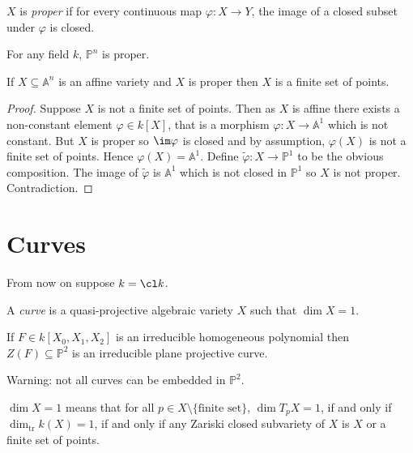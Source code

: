 \documentclass[a4paper]{article}
\renewcommand{\A}{\mathbb{A}}
\renewcommand*{\P}{\mathbb{P}}
\begin{document}
\begin{definition}[proper]
  \(X\) is \emph{proper} if for every continuous map \(\varphi: X \to Y\), the image of a closed subset under \(\varphi\) is closed.
\end{definition}

\begin{theorem}
  For any field \(k\), \(\P^n\) is proper.
\end{theorem}

\begin{corollary}
  If \(X \subseteq \A^n\) is an affine variety and \(X\) is proper then \(X\) is a finite set of points.
\end{corollary}

\begin{proof}
  Suppose \(X\) is not a finite set of points. Then as \(X\) is affine there exists a non-constant element \(\varphi \in k[X]\), that is a morphism \(\varphi: X \to \A^1\) which is not constant. But \(X\) is proper so \(\im \varphi\) is closed and by assumption, \(\varphi(X)\) is not a finite set of points. Hence \(\varphi(X) = \A^1\). Define \(\tilde \varphi: X \to \P^1\) to be the obvious composition. The image of \(\tilde \varphi\) is \(\A^1\) which is not closed in \(\P^1\) so \(X\) is not proper. Contradiction.
\end{proof}

\section{Curves}

From now on suppose \(k = \cl k\).

\begin{definition}[curve]
  A \emph{curve} is a quasi-projective algebraic variety \(X\) such that \(\dim X = 1\).
\end{definition}

\begin{eg}
  If \(F \in k[X_0, X_1, X_2]\) is an irreducible homogeneous polynomial then \(Z(F) \subseteq \P^2\) is an irreducible plane projective curve.
\end{eg}

Warning: not all curves can be embedded in \(\P^2\).

\begin{ex}
  \(\dim X = 1\) means that for all \(p \in X \setminus \{\text{finite set}\}\), \(\dim T_pX = 1\), if and only if \(\dim_{\text{tr}} k(X) = 1\), if and only if any Zariski closed subvariety of \(X\) is \(X\) or a finite set of points.
\end{ex}
\end{document}
